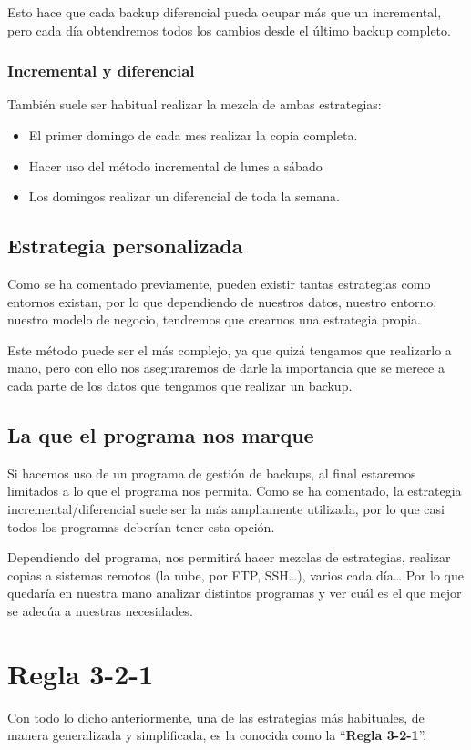 Esto hace que cada backup diferencial pueda ocupar más que un incremental, pero cada día obtendremos todos los cambios desde el último backup completo.

\subsubsection{Incremental y diferencial}
También suele ser habitual realizar la mezcla de ambas estrategias:
\begin{itemize}
    \item El primer domingo de cada mes realizar la copia completa.
    \item Hacer uso del método incremental de lunes a sábado
    \item Los domingos realizar un diferencial de toda la semana.
\end{itemize}

\subsection{Estrategia personalizada}
Como se ha comentado previamente, pueden existir tantas estrategias como entornos existan, por lo que dependiendo de nuestros datos, nuestro entorno, nuestro modelo de negocio, tendremos que crearnos una estrategia propia.

Este método puede ser el más complejo, ya que quizá tengamos que realizarlo a mano, pero con ello nos aseguraremos de darle la importancia que se merece a cada parte de los datos que tengamos que realizar un backup.

\subsection{La que el programa nos marque}
Si hacemos uso de un programa de gestión de backups, al final estaremos limitados a lo que el programa nos permita. Como se ha comentado, la estrategia incremental/diferencial suele ser la más ampliamente utilizada, por lo que casi todos los programas deberían tener esta opción.

Dependiendo del programa, nos permitirá hacer mezclas de estrategias, realizar copias a sistemas remotos (la nube, por FTP, SSH…), varios cada día… Por lo que quedaría en nuestra mano analizar distintos programas y ver cuál es el que mejor se adecúa a nuestras necesidades.


\section{Regla 3-2-1}
Con todo lo dicho anteriormente, una de las estrategias más habituales, de manera generalizada y simplificada, es la conocida como la “\textbf{Regla 3-2-1}”.

